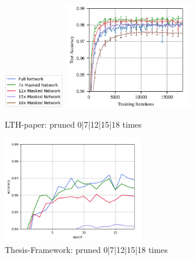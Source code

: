\begin{figure}
	\begin{minipage}{\textwidth}
		\centering
		\includegraphics[width=100px]{gfx/7-Evaluation/LTH_2_legend.png}
	\end{minipage}
	\begin{minipage}{0.5\textwidth}
		\centering
		\includegraphics[height=175px]{gfx/7-Evaluation/LTH_2.png}
		\caption*{LTH-paper: pruned 0|7|12|15|18 times}
		\label{?}
	\end{minipage}\hfill
	\begin{minipage}{0.5\textwidth}
		\centering
		\includegraphics[height=175px]{gfx/Experiments/Reproduction-MNIST-FCN/accuracy/LTH_2.png}
		\caption*{Thesis-Framework: pruned 0|7|12|15|18 times}
		\label{?}
	\end{minipage}
\end{figure}

